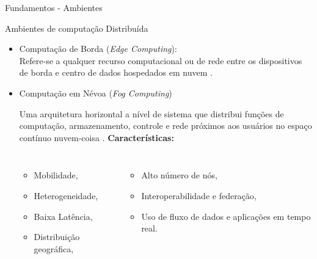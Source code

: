 \documentclass[aspectratio=1610,10pt]{beamer}
\begin{document}
\begin{frame}[fragile]{Fundamentos - Ambientes}
\begin{alertblock}{Ambientes de computação Distribuída}
\begin{itemize}
  \item Computação de Borda (\emph{Edge Computing}):
  \\ Refere-se a qualquer recurso computacional ou de rede entre os dispositivos
  de borda e centro de dados hospedados em nuvem \cite{Shi2016}.

  \item Computação em Névoa (\emph{Fog Computing})
  
  
  
  Uma arquitetura horizontal a nível de sistema que distribui funções de
  computação, armazenamento, controle e rede próximos aos usuários no espaço
  contínuo nuvem-coisa \cite{IEEECommunicationsSociety2018}.
  \textbf{Características:}
  \begin{columns}
    \begin{itemize}
      \item Mobilidade,
      \item Heterogeneidade,
      \item Baixa Latência,
      \item Distribuição geográfica,
    \end{itemize}
    \begin{itemize}
      \item Alto número de nós,
      \item Interoperabilidade e federação,
      \item Uso de fluxo de dados e aplicações em tempo real.
    \end{itemize}
  \end{columns}
\end{itemize}
\end{alertblock}
\end{frame}
\end{document}
